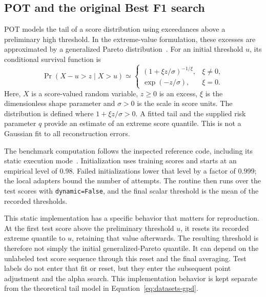 \subsection{POT and the original Best F1 search}
\label{sec:datasets-original-thresholds}
\ac{POT} models the tail of a score distribution using exceedances above a
preliminary high threshold. In the extreme-value formulation, these excesses
are approximated by a generalized Pareto distribution~\cite{Siffer2017POT}.
For an initial threshold \(u\), its conditional survival function is
\begin{equation}
  \Pr(X-u>z\mid X>u)
  \simeq
  \begin{cases}
    \left(1+\xi z/\sigma\right)^{-1/\xi}, & \xi\ne0,\\
    \exp(-z/\sigma), & \xi=0.
  \end{cases}
  \label{eq:datasets-gpd}
\end{equation}
Here, \(X\) is a score-valued random variable, \(z\geq0\) is an excess,
\(\xi\) is the dimensionless shape parameter and \(\sigma>0\) is the
scale in score units. The distribution is defined where
\(1+\xi z/\sigma>0\). A fitted tail and the supplied risk parameter \(q\)
provide an estimate of an extreme score quantile. This is not a Gaussian
fit to all reconstruction errors.

The benchmark computation follows the inspected reference code, including
its static execution mode~\cite{TranADPlusReferenceCode}. Initialization
uses training scores and starts at an empirical level of \num{0.98}. Failed
initializations lower that level by a factor of \num{0.999}; the local
adapters bound the number of attempts. The routine then runs over the test
scores with \texttt{dynamic=False}, and the final scalar threshold is the
mean of the recorded thresholds.

This static implementation has a specific behavior that matters for
reproduction. At the first test score above the preliminary threshold
\(u\), it resets its recorded extreme quantile to \(u\), retaining that
value afterwards. The resulting threshold is therefore not simply the
initial generalized-Pareto quantile. It can depend on the unlabeled test
score sequence through this reset and the final averaging. Test labels
do not enter that fit or reset, but they enter the subsequent point
adjustment and the alpha search. This implementation behavior is kept
separate from the theoretical tail model in Equation~\eqref{eq:datasets-gpd}.

